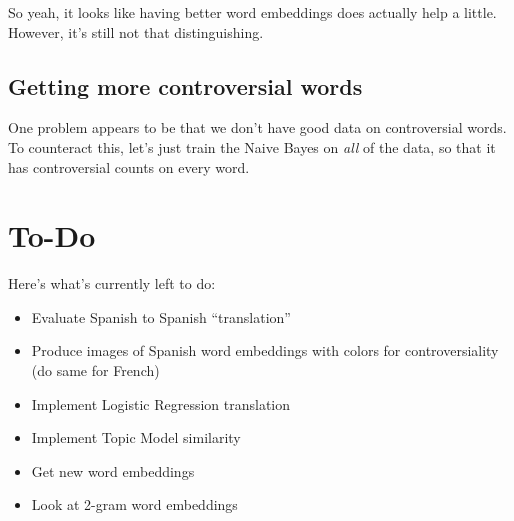 \documentclass[11pt]{article} %
\begin{document}
So yeah, it looks like having better word embeddings does actually help a little. However, it's still not that distinguishing.

\subsection{Getting more controversial words}

One problem appears to be that we don't have good data on controversial words. To counteract this, let's just train the Naive Bayes on \emph{all} of the data, so that it has controversial counts on every word. 


\section{To-Do}
Here's what's currently left to do:
\begin{itemize}
\item Evaluate Spanish to Spanish ``translation''
\item Produce images of Spanish word embeddings with colors for controversiality (do same for French)
\item Implement Logistic Regression translation
\item Implement Topic Model similarity
\item Get new word embeddings
\item Look at 2-gram word embeddings
\end{itemize}
\end{document}
